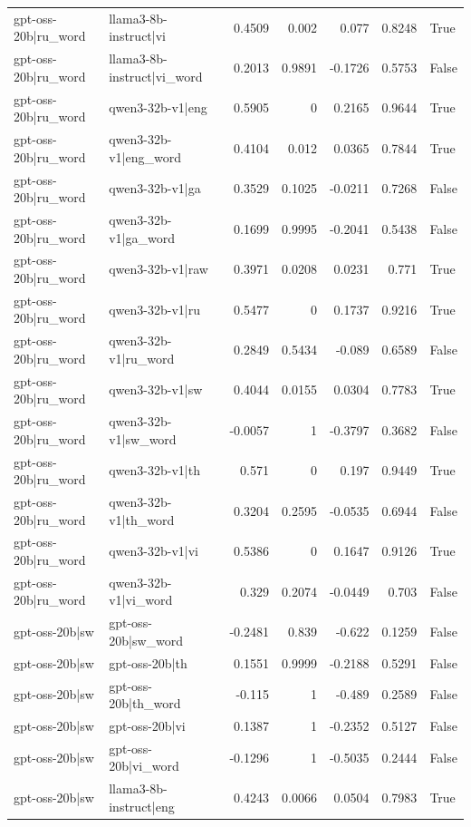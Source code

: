 \begin{table}
\begin{tabular}{l l r r r r l}
gpt-oss-20b|ru_word & llama3-8b-instruct|vi & 0.4509 & 0.002 & 0.077 & 0.8248 & True \\
gpt-oss-20b|ru_word & llama3-8b-instruct|vi_word & 0.2013 & 0.9891 & -0.1726 & 0.5753 & False \\
gpt-oss-20b|ru_word & qwen3-32b-v1|eng & 0.5905 & 0 & 0.2165 & 0.9644 & True \\
gpt-oss-20b|ru_word & qwen3-32b-v1|eng_word & 0.4104 & 0.012 & 0.0365 & 0.7844 & True \\
gpt-oss-20b|ru_word & qwen3-32b-v1|ga & 0.3529 & 0.1025 & -0.0211 & 0.7268 & False \\
gpt-oss-20b|ru_word & qwen3-32b-v1|ga_word & 0.1699 & 0.9995 & -0.2041 & 0.5438 & False \\
gpt-oss-20b|ru_word & qwen3-32b-v1|raw & 0.3971 & 0.0208 & 0.0231 & 0.771 & True \\
gpt-oss-20b|ru_word & qwen3-32b-v1|ru & 0.5477 & 0 & 0.1737 & 0.9216 & True \\
gpt-oss-20b|ru_word & qwen3-32b-v1|ru_word & 0.2849 & 0.5434 & -0.089 & 0.6589 & False \\
gpt-oss-20b|ru_word & qwen3-32b-v1|sw & 0.4044 & 0.0155 & 0.0304 & 0.7783 & True \\
gpt-oss-20b|ru_word & qwen3-32b-v1|sw_word & -0.0057 & 1 & -0.3797 & 0.3682 & False \\
gpt-oss-20b|ru_word & qwen3-32b-v1|th & 0.571 & 0 & 0.197 & 0.9449 & True \\
gpt-oss-20b|ru_word & qwen3-32b-v1|th_word & 0.3204 & 0.2595 & -0.0535 & 0.6944 & False \\
gpt-oss-20b|ru_word & qwen3-32b-v1|vi & 0.5386 & 0 & 0.1647 & 0.9126 & True \\
gpt-oss-20b|ru_word & qwen3-32b-v1|vi_word & 0.329 & 0.2074 & -0.0449 & 0.703 & False \\
gpt-oss-20b|sw & gpt-oss-20b|sw_word & -0.2481 & 0.839 & -0.622 & 0.1259 & False \\
gpt-oss-20b|sw & gpt-oss-20b|th & 0.1551 & 0.9999 & -0.2188 & 0.5291 & False \\
gpt-oss-20b|sw & gpt-oss-20b|th_word & -0.115 & 1 & -0.489 & 0.2589 & False \\
gpt-oss-20b|sw & gpt-oss-20b|vi & 0.1387 & 1 & -0.2352 & 0.5127 & False \\
gpt-oss-20b|sw & gpt-oss-20b|vi_word & -0.1296 & 1 & -0.5035 & 0.2444 & False \\
gpt-oss-20b|sw & llama3-8b-instruct|eng & 0.4243 & 0.0066 & 0.0504 & 0.7983 & True \\

\end{tabular}
\end{table}
